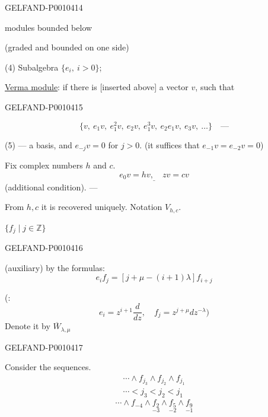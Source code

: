 \begin{GelfandAdjacentEvidence}{GELFAND-P001041}{4}

modules bounded below

(graded and bounded on one side)

(4) Subalgebra $\{e_i,\ i>0\}$;

\underline{Verma module}: if there is [inserted above] a vector $v$, such that
\end{GelfandAdjacentEvidence}
\begin{GelfandAdjacentEvidence}{GELFAND-P001041}{5}

\[
\{v,\ e_1v,\ e_1^2v,\ e_2v,\ e_1^3v,\ e_2e_1v,\ e_3v,\ \ldots\}\quad\text{---}
\]

(5) --- a basis, and $e_{-j}v=0$ for $j>0$.
(it suffices that $e_{-1}v=e_{-2}v=0$)

Fix complex numbers $h$ and $c$.
\begin{equation*}
\underline{e_0v=hv,\quad zv=cv}
\tag{6}
\end{equation*}
(additional condition). ---

From $h,c$ it is recovered uniquely. Notation $V_{h,c}$.

 $\{f_j\mid j\in\mathbb Z\}$
\end{GelfandAdjacentEvidence}
\begin{GelfandAdjacentEvidence}{GELFAND-P001041}{6}

(auxiliary) by the formulas:
\begin{equation*}
e_if_j=[j+\mu-(i+1)\lambda]f_{i+j}
\tag{7}
\end{equation*}

(:
\begin{equation*}
e_i=z^{i+1}\frac{d}{dz},\quad f_j=z^{j+\mu}dz^{-\lambda})
\tag{8}
\end{equation*}
Denote it by $\overline W_{\lambda,\mu}$
\end{GelfandAdjacentEvidence}
\begin{GelfandAdjacentEvidence}{GELFAND-P001041}{7}


Consider the sequences.
\begin{equation*}
\begin{gathered}
\cdots\wedge f_{j_3}\wedge f_{j_2}\wedge f_{j_1}\\
\cdots<j_3<j_2<j_1
\end{gathered}
\tag{9}
\end{equation*}
\[
\cdots\wedge f_{-4}\wedge\underset{-3}{f_2}\wedge\underset{-2}{f_5}\wedge\underset{-1}{f_9}
\]
\end{GelfandAdjacentEvidence}

